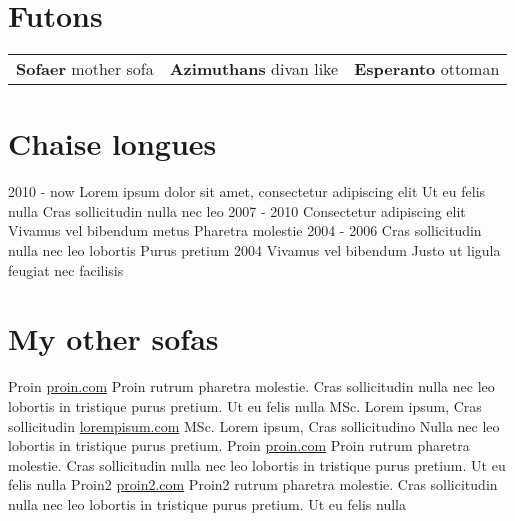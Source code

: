 \documentclass[]{viccuad-cv}
\begin{document}
\section{Futons}
    \begin{tabularx}{\linewidth}{XXr}
        \textbf{Sofaer} mother sofa & \textbf{Azimuthans} divan like & \textbf{Esperanto} ottoman \tabularnewline
    \end{tabularx}


\section{Chaise longues}
    \begin{entrylistdated}
      \entrydated
        {2010 - now}
        {Lorem ipsum dolor sit amet, consectetur adipiscing elit}
        {Ut eu felis nulla}
        {Cras sollicitudin nulla nec leo}
      \entrydated
        {2007 - 2010}
        {Consectetur adipiscing elit}
        {Vivamus vel bibendum metus}
        {Pharetra molestie}
      \entrydated
        {2004 - 2006}
        {Cras sollicitudin nulla nec leo lobortis}
        {}
        {Purus pretium}
      \entrydated
        {2004}
        {Vivamus vel bibendum}
        {Justo ut ligula feugiat nec facilisis}
        {}
    \end{entrylistdated}

\section{My other sofas}
    \begin{entrylist}
      \entry
        {Proin}
        {\href{https://proin.com}{proin.com}}
        {Proin rutrum pharetra molestie. Cras sollicitudin nulla nec leo lobortis in tristique purus pretium. Ut eu felis nulla}
      \entry
        {MSc. Lorem ipsum, Cras sollicitudin}
        {\href{http://loremipsum.com}{lorempisum.com}}
        {}
      \entry
        {MSc. Lorem ipsum, Cras sollicitudino}
        {}
        {Nulla nec leo lobortis in tristique purus pretium.}
      \entry
        {Proin}
        {\href{https://proin.com}{proin.com}}
        {Proin rutrum pharetra molestie. Cras sollicitudin nulla nec leo lobortis in tristique purus pretium. Ut eu felis nulla}
      \entry
        {Proin2}
        {\href{https://proin2.com}{proin2.com}}
        {Proin2 rutrum pharetra molestie. Cras sollicitudin nulla nec leo lobortis in tristique purus pretium. Ut eu felis nulla}
    \end{entrylist}
\end{document}
